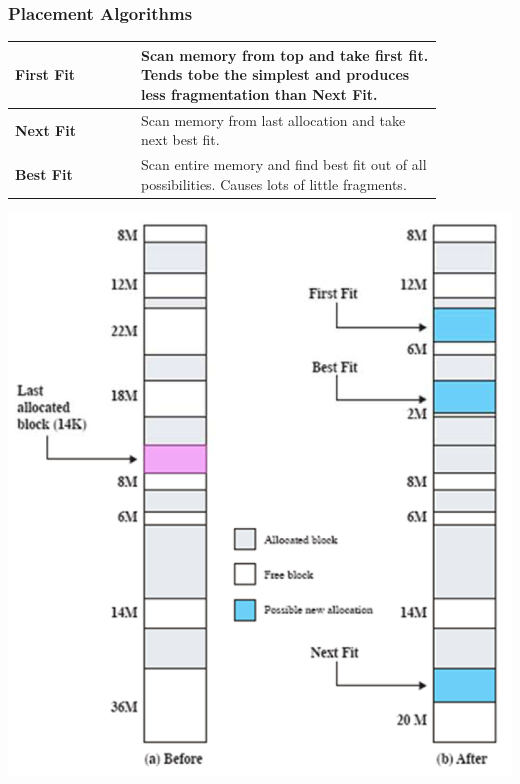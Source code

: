		\subsubsection{Placement Algorithms}
			\begin{minipage}[t]{0.6\textwidth}		
				\begin{table}[H]
					\centering
					\begin{tabular}{|p{0.25\linewidth}|p{0.6\linewidth}|}
						\hline
						\textbf{First Fit}
							& Scan memory from top and take first fit. Tends tobe the simplest and produces less fragmentation than \textbf{Next Fit}.\\
						\hline
						\textbf{Next Fit}
							& Scan memory from last allocation and take next best fit.\\
						\hline
						\textbf{Best Fit}
							& Scan entire memory and find best fit out of all possibilities. Causes lots of little fragments.\\
						\hline	
					\end{tabular}
				\end{table}
			\end{minipage}
			\begin{minipage}[t]{0.4\textwidth}
				\vspace{0pt}
				
				\includegraphics[width=1.1\textwidth]{./pictures/dynamic_partitioning.png}
			\end{minipage}
			
